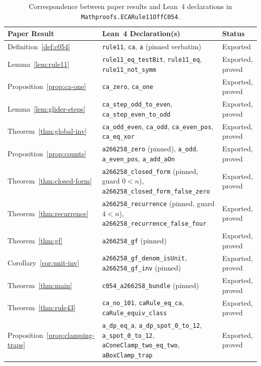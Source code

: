 \documentclass[11pt]{article}
\theoremstyle{definition}
\begin{document}
\begin{table}[ht]
\centering
\caption{Correspondence between paper results and Lean~4 declarations in \nolinkurl{Mathproofs.ECARule11OffC054}.}
\label{tab:lean-map}
\smallskip
{\small
\begin{tabular}{@{}l >{\raggedright\arraybackslash}p{8.2cm} l@{}}
\toprule
Paper Result & Lean~4 Declaration(s) & Status \\
\midrule
Definition~\ref{def:c054} & \texttt{rule11}, \texttt{ca}, \texttt{a} (pinned verbatim) & Exported \\
Lemma~\ref{lem:rule11} & \texttt{rule11\_eq\_testBit}, \texttt{rule11\_eq}, \texttt{rule11\_not\_symm} & Exported, proved \\
Proposition~\ref{prop:ca-one} & \texttt{ca\_zero}, \texttt{ca\_one} & Exported, proved \\
Lemma~\ref{lem:glider-steps} & \texttt{ca\_step\_odd\_to\_even}, \texttt{ca\_step\_even\_to\_odd} & Exported, proved \\
Theorem~\ref{thm:global-inv} & \texttt{ca\_odd\_even}, \texttt{ca\_odd}, \texttt{ca\_even\_pos}, \texttt{ca\_eq\_xor} & Exported, proved \\
Proposition~\ref{prop:counts} & \texttt{a266258\_zero} (pinned), \texttt{a\_odd}, \texttt{a\_even\_pos}, \texttt{a\_add\_aOn} & Exported, proved \\
Theorem~\ref{thm:closed-form} & \texttt{a266258\_closed\_form} (pinned, guard $0 < n$), \texttt{a266258\_closed\_form\_false\_zero} & Exported, proved \\
Theorem~\ref{thm:recurrence} & \texttt{a266258\_recurrence} (pinned, guard $4 < n$), \texttt{a266258\_recurrence\_false\_four} & Exported, proved \\
Theorem~\ref{thm:gf} & \texttt{a266258\_gf} (pinned) & Exported, proved \\
Corollary~\ref{cor:unit-inv} & \texttt{a266258\_gf\_denom\_isUnit}, \texttt{a266258\_gf\_inv} (pinned) & Exported, proved \\
Theorem~\ref{thm:main} & \texttt{c054\_a266258\_bundle} (pinned) & Exported, proved \\
Theorem~\ref{thm:rule43} & \texttt{ca\_no\_101}, \texttt{caRule\_eq\_ca}, \texttt{caRule\_equiv\_class} & Exported, proved \\
Proposition~\ref{prop:clamping-traps} & \texttt{a\_dp\_eq\_a}, \texttt{a\_dp\_spot\_0\_to\_12}, \texttt{a\_spot\_0\_to\_12}, \texttt{aConeClamp\_two\_eq\_two}, \texttt{aBoxClamp\_trap} & Exported, proved \\
\bottomrule
\end{tabular}
}
\end{table}
\end{document}
